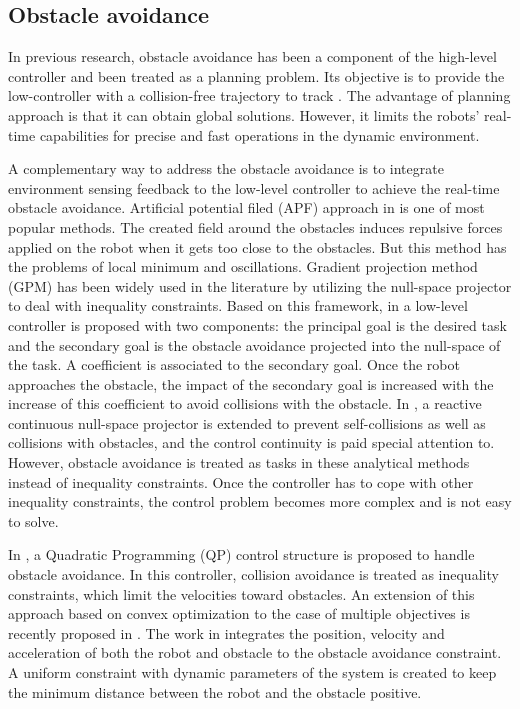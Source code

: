 \subsection{Obstacle avoidance}
In previous research, obstacle avoidance has been a component of the high-level controller and been treated as a planning problem. Its objective is to provide the low-controller with a collision-free trajectory to track \cite{gouzenes1984,lumelsky1987}. The advantage of planning approach is that it can obtain global solutions. However, it limits the robots' real-time capabilities for precise and fast operations in the dynamic environment. 

A complementary way to address the obstacle avoidance is to integrate environment sensing feedback to the low-level controller to achieve the real-time obstacle avoidance. Artificial potential filed (APF) approach in \cite{khatib1986} is one of most popular methods. The created field around the obstacles induces repulsive forces applied on the robot when it gets too close to the obstacles. But this method has the problems of local minimum and oscillations. Gradient projection method (GPM) \cite{liegeois1977} has been widely used in the literature by utilizing the null-space projector to deal with inequality constraints. Based on this framework, in \cite{maciejewski1985} a low-level controller is proposed with two components: the principal goal is the desired task and the secondary goal is the obstacle avoidance projected into the null-space of the task. A coefficient is associated to the secondary goal. Once the robot approaches the obstacle, the impact of the secondary goal is increased with the increase of this coefficient to avoid collisions with the obstacle. In \cite{dietrich2012b}, a reactive continuous null-space projector is extended to prevent self-collisions as well as collisions with obstacles, and the control continuity is paid special attention to. However, obstacle avoidance is treated as tasks in these analytical methods instead of inequality constraints. Once the controller has to cope with other inequality constraints, the control problem becomes more complex and is not easy to solve.

In \cite{faverjon1987}, a Quadratic Programming (QP) control structure is proposed to handle obstacle avoidance. In this controller, collision avoidance is treated as inequality constraints, which limit the velocities toward obstacles. An extension of this approach based on convex optimization to the case of multiple objectives is recently proposed in \cite{kanoun2009}. The work in \cite{salini2012} integrates the position, velocity and acceleration of both the robot and obstacle to the obstacle avoidance constraint. A uniform constraint with dynamic parameters of the system is created to keep the minimum distance between the robot and the obstacle positive. 

